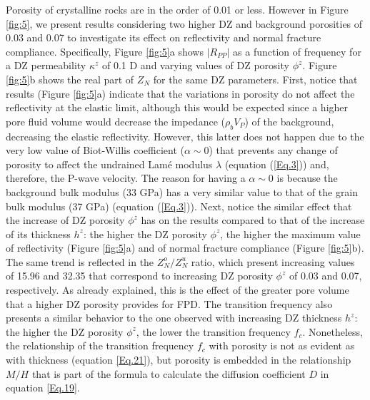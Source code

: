 \documentclass[draft]{agujournal2019}
\begin{document}
Porosity of crystalline rocks are in the order of 0.01 or less. However in Figure \ref{fig:5}, we present results considering two higher DZ and background porosities of 0.03 and 0.07 to investigate its effect on reflectivity and normal fracture compliance. Specifically, Figure \ref{fig:5}a shows $|R_{PP}|$ as a function of frequency for a DZ permeability $ \kappa^z $ of 0.1 D and varying values of DZ porosity $\phi^z$. Figure \ref{fig:5}b shows the real part of $Z_N$ for the same DZ parameters.
First, notice that  results (Figure \ref{fig:5}a)  indicate that the variations in porosity do not affect the reflectivity at the elastic limit, although this would be expected since a higher pore fluid volume would decrease the impedance ($\rho_b V_P$) of the background, decreasing the elastic reflectivity. However, this latter does not happen due to the very low value of Biot-Willis coefficient ($\alpha \sim 0$) that prevents any change of porosity to affect the undrained Lamé modulus $\lambda$ (equation (\ref{Eq.3})) and, therefore, the  P-wave velocity. The reason for having a $\alpha \sim 0$ is because the background bulk modulus (33 GPa) has a very similar value to that of the grain bulk modulus (37 GPa) (equation (\ref{Eq.3})). Next, notice the similar effect that the increase of DZ porosity $\phi^z$ has on the results compared to that of the increase of its thickness $h^z$: the higher the DZ porosity $\phi^z$, the higher the maximum value of reflectivity (Figure \ref{fig:5}a) and of normal fracture compliance (Figure \ref{fig:5}b). The same trend is reflected in the $Z_N^o/Z_N^u$ ratio, which present increasing values of 15.96 and  32.35  that correspond to increasing DZ porosity $\phi^z$ of 0.03 and 0.07, respectively. As already explained, this is the effect of the greater pore volume that a higher DZ porosity provides for FPD.
The transition frequency also presents a similar behavior to the one observed with increasing DZ thickness $h^z$: the higher the DZ porosity $\phi^z$, the lower the transition frequency $f_c$. Nonetheless, the relationship of the transition frequency $f_c$ with porosity is not as evident as with thickness (equation \ref{Eq.21}), but porosity is embedded in the relationship $M/H$ that is part of the formula to calculate the diffusion coefficient $D$ in equation \ref{Eq.19}.
\end{document}
